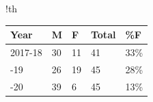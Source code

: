 %
%

\begin{tabbox}{!th}
\caption{Number of PhD students registered from 2017-18 to 2019-20 by  gender}
\label{tab:phdregistrations}
\footnotesize 



\begin{tabular}{p{3cm}
                R{1cm}
                C{1.2cm}           
                C{1.3cm}
                R{1cm}
                }
\toprule                 
\textmd{Year}&
\textmd{M}&
\textmd{F}&
\textmd{Total}&
\textmd{\%F}\\ 
-18&30 &11 &41 & 33\%\\
-19&26 &19 &45 & 28\%\\
-20&39 &6 &45 & 13\%\\
\bottomrule 
\end{tabular}


\end{tabbox}


